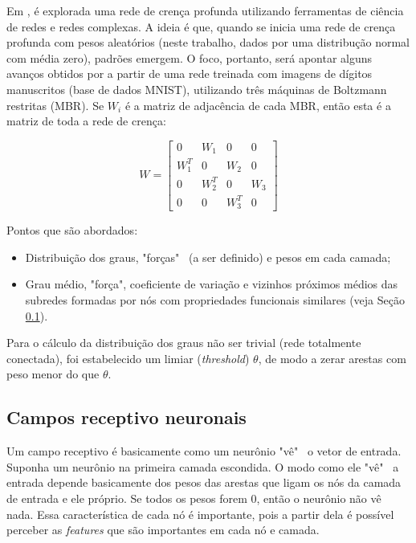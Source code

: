 \documentclass{article}
\begin{document}
        Em \cite{testolin2018deep}, é explorada uma rede de crença profunda utilizando ferramentas de ciência de redes e redes complexas.
        A ideia é que, quando se inicia uma rede de crença profunda com pesos aleatórios (neste trabalho, dados por uma distribução normal com média zero), padrões emergem.
        O foco, portanto, será apontar alguns avanços obtidos por \cite{testolin2018deep} a partir de uma rede treinada com imagens de dígitos manuscritos (base de dados MNIST), utilizando três máquinas de Boltzmann restritas (MBR).
        Se $W_i$ é a matriz de adjacência de cada MBR, então esta é a matriz de toda a rede de crença:

        \begin{equation}
            W = \begin{bmatrix}
                    0 & W_1 & 0 & 0 \\
                    W_1^T & 0 & W_2 & 0 \\
                    0 & W_2^T & 0 & W_3 \\
                    0 & 0 & W_3^T & 0
                \end{bmatrix}
        \end{equation}

        Pontos que são abordados:
        
        \begin{itemize}
            \item Distribuição dos graus, "forças" \ (a ser definido) e pesos em cada camada;
            \item Grau médio, "força", coeficiente de variação e vizinhos próximos médios das subredes formadas por nós com propriedades funcionais similares (veja Seção \ref{field}).
        \end{itemize}

        Para o cálculo da distribuição dos graus não ser trivial (rede totalmente conectada), foi estabelecido um limiar (\textit{threshold}) $\theta$, de modo a zerar arestas com peso menor do que $\theta$.

        \subsection{Campos receptivo neuronais}
            \label{field}

            Um campo receptivo é basicamente como um neurônio "vê" \ o vetor de entrada.
            Suponha um neurônio na primeira camada escondida.
            O modo como ele "vê" \ a entrada depende basicamente dos pesos das arestas que ligam os nós da camada de entrada e ele próprio.
            Se todos os pesos forem $0$, então o neurônio não vê nada.
            Essa característica de cada nó é importante, pois a partir dela é possível perceber as \textit{features} que são importantes em cada nó e camada.
\end{document}
